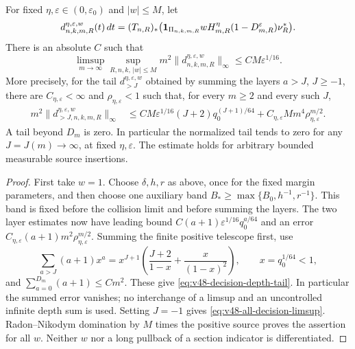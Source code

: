 \begin{theorem}
\label{thm:v48-all-decision-smallness}
For fixed $\eta,\varepsilon\in(0,\varepsilon_0)$ and $|w|\le M$, let
\begin{equation}\label{eq:v48-all-decision-density}
 d^{\eta,\varepsilon,w}_{n,k,m,R}(t)\,dt
  =(T_{n,R})_*\bigl(\one_{\Pi_{n,k,m,R}}w
       H_{m,R}^{\eta}(1-D_{m,R}^{\varepsilon})\nu_R^*\bigr).
\end{equation}
There is an absolute $C$ such that
\begin{equation}\label{eq:v48-all-decision-limsup}
 \limsup_{m\to\infty}\sup_{R,n,k,\,|w|\le M}
        m^2\|d^{\eta,\varepsilon,w}_{n,k,m,R}\|_\infty
                                  \le CM\varepsilon^{1/16}.
\end{equation}
More precisely, for the tail $d^{\eta,\varepsilon,w}_{>J}$ obtained
by summing the layers $a>J$, $J\ge-1$, there are
$C_{\eta,\varepsilon}<\infty$ and $\rho_{\eta,\varepsilon}<1$ such
that, for every $m\ge2$ and every such $J$,
\begin{align}
 m^2\|d^{\eta,\varepsilon,w}_{>J,n,k,m,R}\|_\infty
 &\le CM\varepsilon^{1/16}(J+2)q_0^{(J+1)/64}
                  +C_{\eta,\varepsilon}M m^4
                                      \rho_{\eta,\varepsilon}^{m/2}.
                                      \label{eq:v48-decision-depth-tail}
\end{align}
A tail beyond $D_m$ is zero. In particular the normalized tail tends
to zero for any $J=J(m)\to\infty$, at fixed $\eta,\varepsilon$.
The estimate holds for arbitrary bounded measurable source insertions.
\end{theorem}
\begin{proof}
First take $w=1$. Choose $\delta,h,r$ as above, once for the fixed
margin parameters, and then choose one auxiliary band
$B_*\ge\max\{B_0,h^{-1},r^{-1}\}$. This band is fixed before the
collision limit and before summing the layers. The two layer
estimates now have leading bound
$C(a+1)\varepsilon^{1/16}q_0^{a/64}$ and an error
$C_{\eta,\varepsilon}(a+1)m^2\rho_{\eta,\varepsilon}^{m/2}$.
Summing the finite positive telescope first, use
\[
 \sum_{a>J}(a+1)x^a
 =x^{J+1}\left(\frac{J+2}{1-x}+\frac{x}{(1-x)^2}\right),
       \qquad x=q_0^{1/64}<1,
\]
and $\sum_{a=0}^{D_m}(a+1)\le C m^2$.
These give \eqref{eq:v48-decision-depth-tail}. In particular the
summed error vanishes; no interchange of a limsup and an uncontrolled
infinite depth sum is used. Setting $J=-1$ gives
\eqref{eq:v48-all-decision-limsup}. Radon--Nikodym domination by
$M$ times the positive source proves the assertion for all $w$.
Neither $w$ nor a long pullback of a section indicator is differentiated.
\end{proof}

